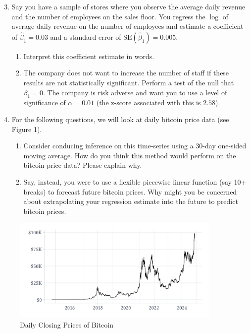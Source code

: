 \documentclass[12pt]{article}
\begin{document}
\newpage
\begin{enumerate}
  \setcounter{enumi}{2}
  \item Say you have a sample of stores where you observe the average daily revenue and the number of employees on the sales floor. You regress the $\log$ of average daily revenue on the number of employees and estimate a coefficient of $\hat{\beta}_1 = 0.03$ and a standard error of $\text{SE}(\hat{\beta}_1) = 0.005$. 
  \begin{enumerate}
    \item Interpret this coefficient estimate in words.
    
    \item The company does not want to increase the number of staff if these results are not statistically significant. Perform a test of the null that $\beta_1 = 0$. The company is risk adverse and want you to use a level of significance of $\alpha = 0.01$ (the z-score associated with this is $2.58$). 
  \end{enumerate}
  
  \bigskip
  \item For the following questions, we will look at daily bitcoin price data (see Figure 1).
  \begin{enumerate}
    \item Consider conducing inference on this time-series using a 30-day one-sided moving average. How do you think this method would perform on the bitcoin price data? Please explain why.
    
    \item Say, instead, you were to use a flexible piecewise linear function (say 10+ breaks) to forecast future bitcoin prices. Why might you be concerned about extrapolating your regression estimate into the future to predict bitcoin prices.
  \end{enumerate}
\end{enumerate}

\bigskip
\begin{figure}[h!]
  \caption{Daily Closing Prices of Bitcoin}
  \label{fig:bitcoin}
  
  \vspace*{-2\bigskipamount}
  \begin{center}
    \includegraphics[width = 0.9\textwidth]{figures/bitcoin_raw.pdf}
  \end{center}
\end{figure}
\end{document}
